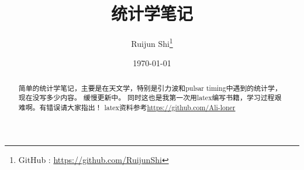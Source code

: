 \documentclass[fontset=windows]{report}
\title{\heiti\zihao{1} 统计学笔记}
\author{\songti\zihao{3} Ruijun Shi\thanks{GitHub : \href{https://github.com/RuijunShi}{https://github.com/RuijunShi}}}
\date{\songti\zihao{3} \today}
\begin{document}
	\maketitle
	\thispagestyle{empty}
\begin{abstract}
	简单的统计学笔记，主要是在天文学，特别是引力波和pulsar timing中遇到的统计学，现在没写多少内容。
	缓慢更新中\cite{jaranowski_analysis_2009}。
	同时这也是我第一次用latex编写书籍，学习过程艰难啊。有错误请大家指出！
	latex资料参考\href{https://github.com/Ali-loner/Ali-loner.github.io}{https://github.com/Ali-loner}
\end{abstract}

\tableofcontents %







\end{document}
